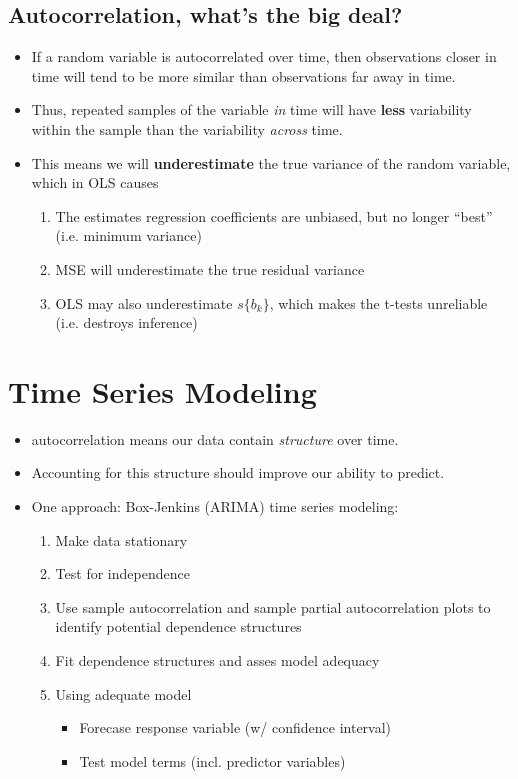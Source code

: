 \documentclass[12pt]{../notes}
\begin{document}
\subsection{Autocorrelation, what's the big deal?} 

\begin{itemize}[leftmargin = *]
\item If a random variable is autocorrelated over time, then observations closer in time will tend to be more similar than observations far away in time. 
\item Thus, repeated samples of the variable \textit{in} time will have \textbf{less} variability within the sample than the variability \textit{across} time. 
\item This means we will \textbf{underestimate} the true variance of the random variable, which in OLS causes
\begin{enumerate}
\item The estimates regression coefficients are unbiased, but no longer ``best'' (i.e. minimum variance)
\item MSE will underestimate the true residual variance
\item OLS may also underestimate $s\{b_k\}$, which makes the t-tests unreliable (i.e. destroys inference) 
\end{enumerate}
\end{itemize}

\section{Time Series Modeling}
\begin{itemize}
\item autocorrelation means our data contain \textit{structure} over time. 
\item Accounting for this structure should improve our ability to predict. 
\item One approach: Box-Jenkins (ARIMA) time series modeling:
\begin{enumerate}
\item Make data stationary
\item Test for independence
\item Use sample autocorrelation and sample partial autocorrelation plots to identify potential dependence structures
\item Fit dependence structures and asses model adequacy
\item Using adequate model
\begin{itemize}
\item Forecase response variable (w/ confidence interval)
\item Test model terms (incl. predictor variables)
\end{itemize}
\end{enumerate}
\end{itemize}
\end{document}

